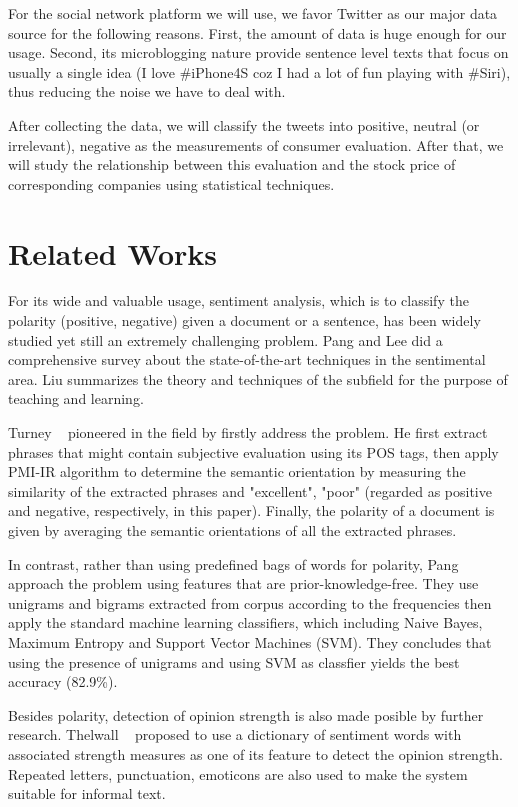 \documentclass[12pt]{article}
\begin{document}
For the social network platform we will use, we favor Twitter as our major data source for the following reasons. First, the amount of data is huge enough for our usage. Second, its microblogging nature provide sentence level texts that focus on usually a single idea (I love \#iPhone4S coz I had a lot of fun playing with \#Siri), thus reducing the noise we have to deal with.

After collecting the data, we will classify the tweets into positive, neutral (or irrelevant), negative as the measurements of consumer evaluation. After that, we will study the relationship between this evaluation and the stock price of corresponding companies using statistical techniques.

\section{Related Works}
For its wide and valuable usage, sentiment analysis, which is to classify the polarity (positive, negative) given a document or a sentence, has been widely studied yet still an extremely challenging problem. Pang and Lee \cite{Pang:08} did a comprehensive survey about the state-of-the-art techniques in the sentimental area. Liu \cite{Liu:10} summarizes the theory and techniques of the subfield for the purpose of teaching and learning.

Turney \etal~\cite{Turney:02} pioneered in the field by firstly address the problem. He first extract phrases that might contain subjective evaluation using its POS tags, then apply PMI-IR algorithm \cite{Turney:01} to determine the semantic orientation by measuring the similarity of the extracted phrases and "excellent", "poor" (regarded as positive and negative, respectively, in this paper). Finally, the polarity of a document is given by averaging the semantic orientations of all the extracted phrases.

In contrast, rather than using predefined bags of words for polarity, Pang \etal~\cite{Pang:02} approach the problem using features that are prior-knowledge-free. They use unigrams and bigrams extracted from corpus according to the frequencies then apply the standard machine learning classifiers, which including Naive Bayes, Maximum Entropy and Support Vector Machines (SVM). They concludes that using the presence of unigrams and using SVM as classfier yields the best accuracy (82.9\%).

Besides polarity, detection of opinion strength is also made posible by further research. Thelwall \etal~\cite{Thelwall:10} proposed to use a dictionary of sentiment words with associated strength measures as one of its feature to detect the opinion strength. Repeated letters, punctuation, emoticons are also used to make the system suitable for informal text.
\end{document}
